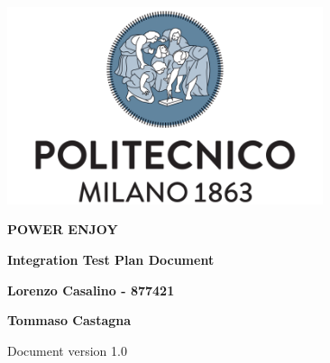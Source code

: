 \begin{titlepage}
        \begin{center}
                \includegraphics[width=350px]{../Datas/images/polimi.png}

                \vspace*{2.0cm}

                {\Huge \textbf{POWER ENJOY}\par}

                \vspace*{1.0cm}

                {\LARGE \textbf{Integration Test Plan Document}\par}

                \vspace*{2.0cm}

                {\normalsize
                \textbf{Lorenzo Casalino - 877421}\par
                \textbf{Tommaso Castagna}\par
                }

                \vfill
                Document version 1.0
        \end{center}
\end{titlepage}

